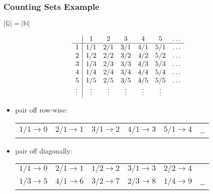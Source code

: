 \documentclass[dvipsnames]{beamer}
\begin{document}
\begin{frame}
  \frametitle{Counting Sets Example}

  $|\mathbb{Q}| = |\mathbb{N}|$

  \medskip
  \begin{footnotesize}
    \[
    \begin{array}{l|ccccccc|}
             &  $1$   &  $2$   &  $3$   &  $4$   &  $5$   & \ldots\\\hline
      $1$    & $1/1$  & $2/1$  & $3/1$  & $4/1$  & $5/1$  & \ldots\\
      $2$    & $1/2$  & $2/2$  & $3/2$  & $4/2$  & $5/2$  & \ldots\\
      $3$    & $1/3$  & $2/3$  & $3/3$  & $4/3$  & $5/3$  & \ldots\\
      $4$    & $1/4$  & $2/4$  & $3/4$  & $4/4$  & $5/4$  & \ldots\\
      $5$    & $1/5$  & $2/5$  & $3/5$  & $4/5$  & $5/5$  & \ldots\\
      \vdots & \vdots & \vdots & \vdots & \vdots & \vdots &
    \end{array}
    \]

    \pause
    \begin{itemize}
      \item pair off row-wise:\\
      \begin{tabular}{llllll}
        $1/1 \rightarrow 0$ & $2/1 \rightarrow 1$ & $3/1 \rightarrow 2$
                            & $4/1 \rightarrow 3$ & $5/1 \rightarrow 4$ & \ldots\\
      \end{tabular}

      \pause
      \item pair off diagonally:\\
      \begin{tabular}{llllll}
        $1/1 \rightarrow 0$ & $2/1 \rightarrow 1$ & $1/2 \rightarrow 2$
                            & $3/1 \rightarrow 3$ & $2/2 \rightarrow 4$ & \\
        $1/3 \rightarrow 5$ & $4/1 \rightarrow 6$ & $3/2 \rightarrow 7$
                            & $2/3 \rightarrow 8$ & $1/4 \rightarrow 9$ & \ldots
      \end{tabular}
    \end{itemize}
  \end{footnotesize}
\end{frame}
\end{document}
